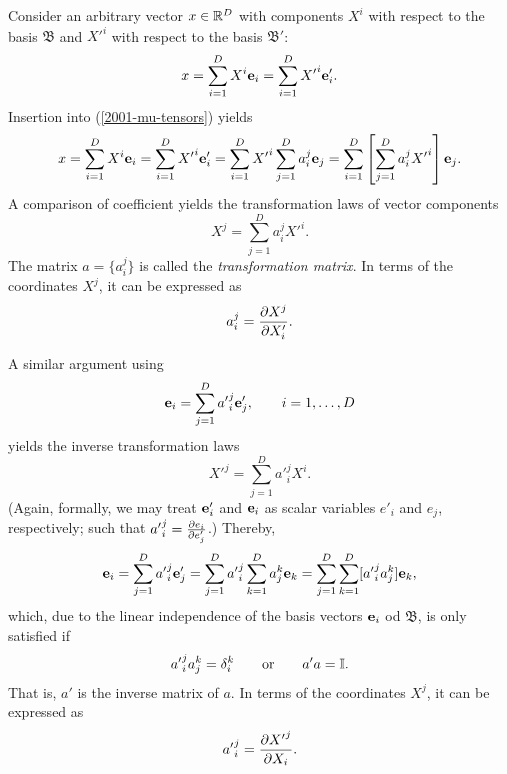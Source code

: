 Consider an arbitrary vector $x\in {\Bbb R}^D$
with components $X^i$ with respect to the basis
${\mathfrak B}$
and   ${X'}^i$  with respect to the basis
${\mathfrak B'}$:
\begin{equation}
x
=\sum_{i=1}^D X^i {\bf e}_i
=\sum_{i=1}^D {X'}^i {\bf e}'_i
.
\end{equation}
Insertion into (\ref{2001-mu-tensors}) yields
\begin{equation}
x
=\sum_{i=1}^D X^i {\bf e}_i
=\sum_{i=1}^D {X'}^i {\bf e}'_i
=\sum_{i=1}^D {X'}^i \sum_{j=1}^D a_i^j {\bf e}_j=
\sum_{i=1}^D\left[\sum_{j=1}^D a_i^j{X'}^i \right] {\bf e}_j.
\end{equation}
A comparison of coefficient yields the transformation laws of vector components
\begin{equation}
X^j   = \sum_{j=1}^D a_i^j{X'}^i.
\end{equation}
The matrix $a=\{a_i^j\}$ is called the {\em transformation matrix}.
In terms of the coordinates $X^j$, it can be expressed as
\begin{equation}
a_i^j ={\partial X^j \over \partial X'_i}  .
\label{2001-mu-tensor-tl1}
\end{equation}


A similar argument using
\begin{equation}
{\bf e}_i=\sum_{j=1}^D {a'}_i^j {\bf e}'_j, \qquad i=1,\ldots , D
\end{equation}
yields the inverse transformation laws
\begin{equation}
{X'}^j   = \sum_{j=1}^D {a'}_i^j{X}^i.
\end{equation}
(Again, formally, we may treat  ${\bf e}'_i$ and ${\bf e}_i$
as scalar variables $e'_i$ and $e_j$, respectively; such that
${a'}_i^j ={\partial {e}_i \over \partial { e}'_j}$.)
Thereby,
\begin{equation}
{\bf e}_i=\sum_{j=1}^D {a'}_i^j {\bf e}'_j
=\sum_{j=1}^D {a'}_i^j \sum_{k=1}^D a_j^k {\bf e}_k
=\sum_{j=1}^D \sum_{k=1}^D [{a'}_i^j a_j^k] {\bf e}_k,
\end{equation}
which, due to the linear independence of the basis vectors ${\bf e}_i$ od ${\mathfrak B}$,
is only satisfied if
\begin{equation}
{a'}_i^j a_j^k =\delta_i^k
\qquad
{\rm or}
\qquad
a'a={\Bbb I}.
\end{equation}
That is, $a'$ is the inverse matrix of $a$.
In terms of the coordinates $X^j$, it can be expressed as
\begin{equation}
{a'}_i^j ={\partial {X'}^j \over \partial X_i}  .
\label{2001-mu-tensor-tl2}
\end{equation}

